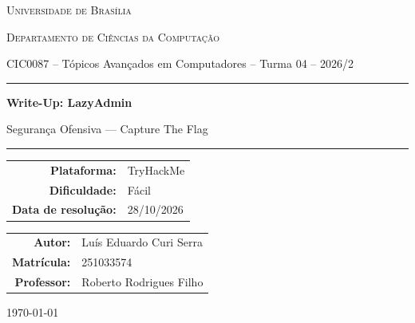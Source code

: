 \documentclass[12pt,a4paper]{article}
\newcommand{\desafioNome}{LazyAdmin}
\newcommand{\plataforma}{TryHackMe}
\newcommand{\dificuldade}{Fácil}
\newcommand{\dataResolucao}{28/10/2026}
\newcommand{\autorNome}{Luís Eduardo Curi Serra}
\newcommand{\materia}{CIC0087 -- Tópicos Avançados em Computadores -- Turma 04 -- 2026/2}
\newcommand{\departamento}{Departamento de Ciências da Computação}
\newcommand{\matricula}{251033574}
\newcommand{\professor}{Roberto Rodrigues Filho}
\newcommand{\universidade}{Universidade de Brasília}
\begin{document}
\begin{titlepage}
  \thispagestyle{empty}
  \centering
  {\scshape \universidade \par}
  {\scshape \departamento \par}
  \vspace{0.4cm}
  {\small \materia \par}
  \vspace{2.5cm}

  \rule{\linewidth}{0.4pt}\par
  \vspace{0.6cm}
  {\huge \bfseries Write-Up: \desafioNome \par}
  \vspace{0.4cm}
  {\large Segurança Ofensiva --- Capture The Flag \par}
  \vspace{0.6cm}
  \rule{\linewidth}{0.4pt}\par

  \vspace{2.0cm}
  \begin{tabular}{rl}
    \textbf{Plataforma:}       & \plataforma       \\[4pt]
    \textbf{Dificuldade:}      & \dificuldade      \\[4pt]
    \textbf{Data de resolução:}& \dataResolucao    \\
  \end{tabular}

  \vfill

  \begin{tabular}{rl}
    \textbf{Autor:}     & \autorNome  \\[4pt]
    \textbf{Matrícula:} & \matricula  \\[4pt]
    \textbf{Professor:} & \professor  \\
  \end{tabular}

  \vspace{1.2cm}
  {\small \today \par}
\end{titlepage}

\newpage
\tableofcontents
\thispagestyle{fancy}
\newpage

\end{document}
